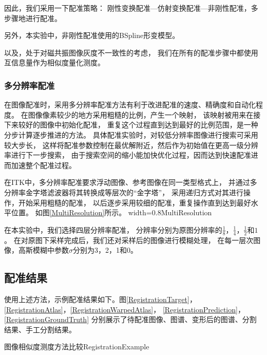 因此，我们采用一下配准策略：
刚性变换配准---仿射变换配准---非刚性配准，多步骤地进行配准。

另外，本实验中，非刚性配准使用的BSpline形变模型。

以及，处于对磁共振图像灰度不一致性的考虑，
我们在所有的配准步骤中都使用互信息量作为相似度量化测度。

\subsubsection{多分辨率配准}
在图像配准时，采用多分辨率配准方法有利于改进配准的速度、精确度和自动化程度。
在图像像素较少的地方采用粗糙的比例，产生一个映射，
该映射被用来在接下来较好的图像中初始化配准，
重复这个过程直到达到最好的比例范围，是一种分步计算逐步推进的方法。
具体配准实验时，对较低分辨率图像进行搜索可采用较大步长，
这样将配准参数控制在最优解附近，然后作为初始值在更高一级分辨率进行下一步搜索，
由于搜索空间的缩小能加快优化过程，因而达到快速配准进而加速整个配准过程。

在ITK中，多分辨率配准要求浮动图像、参考图像在同一类型格式上，
并通过多分辨率金字塔滤波器将其转换成等层次的``金字塔''，
采用递归方式对其进行操作，开始采用粗糙的配准，
以后逐步采用较细的配准，重复操作直到达到最好水平位置。
如图\ref{MultiResolution}所示。
%
{width=0.8\textwidth}{MultiResolution}

在本实验中，我们选择四层分辨率配准，
分辨率分别为原图分辨率的$\frac{1}{8}$，$\frac{1}{4}$，$\frac{1}{2}$和$1$。
在对原图下采样完成后，我们还对采样后的图像进行模糊处理，
在每一层次图像，高斯模糊中参数$\sigma$分别为3，2，1和0。

\subsection{配准结果}
使用上述方法，示例配准结果如下。图\ref{RegistrationTarget}，
\ref{RegistrationAtlas}，\ref{RegistrationWarpedAtlas}，
\ref{RegistrationPrediction}，\ref{RegistrationGroundTruth}
分别展示了待配准图像、图谱、变形后的图谱、分割结果、手工分割结果。
\begin{pics}[htpb]{图像相似度测度方法比较}{RegistrationExample}
\end{pics}

